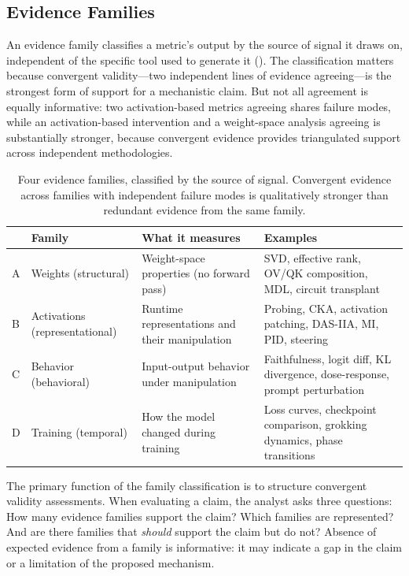 \documentclass{article}
\begin{document}
\subsection{Evidence Families}
\label{sec:evidence-families}

An evidence family classifies a metric's output by the source of signal it draws on, independent of the specific tool used to generate it (). The classification matters because convergent validity---two independent lines of evidence agreeing---is the strongest form of support for a mechanistic claim. But not all agreement is equally informative: two activation-based metrics agreeing shares failure modes, while an activation-based intervention and a weight-space analysis agreeing is substantially stronger, because convergent evidence provides triangulated support across independent methodologies.

\begin{table}[H]
\centering
\small
\caption{Four evidence families, classified by the source of signal. Convergent evidence across families with independent failure modes is qualitatively stronger than redundant evidence from the same family.}
\label{tab:families}
\renewcommand{\arraystretch}{1.2}
\begin{tabular}{@{}ll>{\raggedright\arraybackslash}p{4.5cm}>{\raggedright\arraybackslash}p{5cm}@{}}
\toprule
& \textbf{Family} & \textbf{What it measures} & \textbf{Examples} \\
\midrule
A & Weights (structural) & Weight-space properties (no forward pass) & SVD, effective rank, OV/QK composition, MDL, circuit transplant \\
\midrule
B & Activations (representational) & Runtime representations and their manipulation & Probing, CKA, activation patching, DAS-IIA, MI, PID, steering \\
\midrule
C & Behavior (behavioral) & Input-output behavior under manipulation & Faithfulness, logit diff, KL divergence, dose-response, prompt perturbation \\
\midrule
D & Training (temporal) & How the model changed during training & Loss curves, checkpoint comparison, grokking dynamics, phase transitions \\
\bottomrule
\end{tabular}
\end{table}

The primary function of the family classification is to structure convergent validity assessments. When evaluating a claim, the analyst asks three questions: How many evidence families support the claim? Which families are represented? And are there families that \emph{should} support the claim but do not? Absence of expected evidence from a family is informative: it may indicate a gap in the claim or a limitation of the proposed mechanism.
\end{document}
